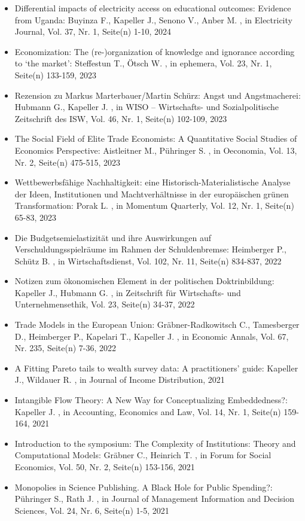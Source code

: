 \begin{itemize}
\item Differential impacts of electricity access on educational outcomes: Evidence from Uganda: Buyinza F., Kapeller J., Senono V., Anber M. , in Electricity Journal, Vol. 37, Nr. 1, Seite(n) 1-10, 2024
\item Economization: The (re-)organization of knowledge and ignorance according to ‘the market’: Steffestun T., Ötsch W. , in ephemera, Vol. 23, Nr. 1, Seite(n) 133-159, 2023
\item Rezension zu Markus Marterbauer/Martin Schürz: Angst und Angstmacherei: Hubmann G., Kapeller J. , in WISO – Wirtschafts- und Sozialpolitische Zeitschrift des ISW, Vol. 46, Nr. 1, Seite(n) 102-109, 2023
\item The Social Field of Elite Trade Economists: A Quantitative Social Studies of Economics Perspective: Aistleitner M., Pühringer S. , in Oeconomia, Vol. 13, Nr. 2, Seite(n) 475-515, 2023
\item Wettbewerbsfähige Nachhaltigkeit: eine Historisch-Materialistische Analyse der Ideen, Institutionen und Machtverhältnisse in der europäischen grünen Transformation: Porak L. , in Momentum Quarterly, Vol. 12, Nr. 1, Seite(n) 65-83, 2023
\item Die Budgetsemielastizität und ihre Auswirkungen auf Verschuldungsspielräume im Rahmen der Schuldenbremse: Heimberger P., Schütz B. , in Wirtschaftsdienst, Vol. 102, Nr. 11, Seite(n) 834-837, 2022
\item Notizen zum ökonomischen Element in der politischen Doktrinbildung: Kapeller J., Hubmann G. , in Zeitschrift für Wirtschafts- und Unternehmensethik, Vol. 23, Seite(n) 34-37, 2022
\item Trade Models in the European Union: Gräbner-Radkowitsch C., Tamesberger D., Heimberger P., Kapelari T., Kapeller J. , in Economic Annals, Vol. 67, Nr. 235, Seite(n) 7-36, 2022
\item A Fitting Pareto tails to wealth survey data: A practitioners’ guide: Kapeller J., Wildauer R. , in Journal of Income Distribution, 2021
\item Intangible Flow Theory: A New Way for Conceptualizing Embeddedness?: Kapeller J. , in Accounting, Economics and Law, Vol. 14, Nr. 1, Seite(n) 159-164, 2021
\item Introduction to the symposium: The Complexity of Institutions: Theory and Computational Models: Gräbner C., Heinrich T. , in Forum for Social Economics, Vol. 50, Nr. 2, Seite(n) 153-156, 2021
\item Monopolies in Science Publishing. A Black Hole for Public Spending?: Pühringer S., Rath J. , in Journal of Management Information and Decision Sciences, Vol. 24, Nr. 6, Seite(n) 1-5, 2021

\end{itemize}
